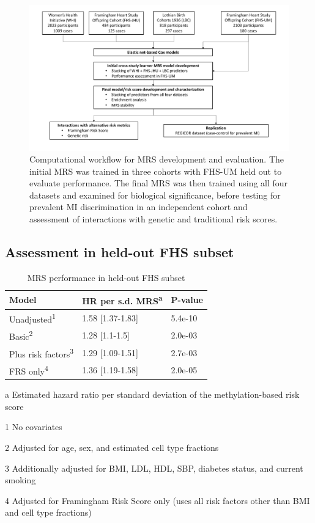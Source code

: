 \documentclass[]{article}
\begin{document}
\begin{figure}
\centering
\includegraphics{workflow.pdf}
\caption{Computational workflow for MRS development and evaluation. The
initial MRS was trained in three cohorts with FHS-UM held out to
evaluate performance. The final MRS was then trained using all four
datasets and examined for biological significance, before testing for
prevalent MI discrimination in an independent cohort and assessment of
interactions with genetic and traditional risk scores.}
\end{figure}

\hypertarget{assessment-in-held-out-fhs-subset}{%
\subsection{Assessment in held-out FHS
subset}\label{assessment-in-held-out-fhs-subset}}

\begin{table}

\caption{\label{tab:fhs-holdout}MRS performance in held-out FHS subset}
\centering
\begin{threeparttable}
\begin{tabular}[t]{lll}
\toprule
Model & HR per s.d. MRS\textsuperscript{a} & P-value\\
\midrule
Unadjusted\textsuperscript{1} & 1.58 [1.37-1.83] & 5.4e-10\\
Basic\textsuperscript{2} & 1.28 [1.1-1.5] & 2.0e-03\\
Plus risk factors\textsuperscript{3} & 1.29 [1.09-1.51] & 2.7e-03\\
FRS only\textsuperscript{4} & 1.36 [1.19-1.58] & 2.0e-05\\
\bottomrule
\end{tabular}
\begin{tablenotes}
\item[a] Estimated hazard ratio per standard deviation of the methylation-based risk score
\item[1] No covariates
\item[2] Adjusted for age, sex, and estimated cell type fractions
\item[3] Additionally adjusted for BMI, LDL, HDL, SBP, diabetes status, and current smoking
\item[4] Adjusted for Framingham Risk Score only (uses all risk factors other than BMI and cell type fractions)
\end{tablenotes}
\end{threeparttable}
\end{table}
\end{document}
